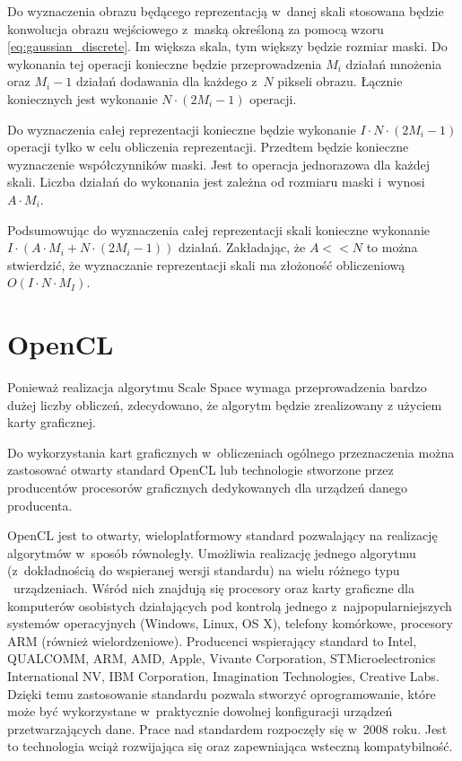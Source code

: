Do wyznaczenia obrazu będącego reprezentacją w~danej skali stosowana będzie konwolucja obrazu wejściowego z~maską określoną za pomocą wzoru \ref{eq:gaussian_discrete}. Im większa skala, tym większy będzie rozmiar maski. Do wykonania tej operacji konieczne będzie przeprowadzenia $ M_i $ działań mnożenia oraz $ M_i - 1 $ działań dodawania dla każdego z~$N$ pikseli obrazu. Łącznie koniecznych jest wykonanie $ N \cdot (2M_i - 1) $ operacji.

Do wyznaczenia całej reprezentacji konieczne będzie wykonanie $ I \cdot N \cdot (2M_i - 1) $ operacji tylko w celu obliczenia reprezentacji. Przedtem będzie konieczne wyznaczenie współczynników maski. Jest to operacja jednorazowa dla każdej skali. Liczba działań do wykonania jest zależna od rozmiaru maski i~wynosi $ A \cdot M_i $.

Podsumowując do wyznaczenia całej reprezentacji skali konieczne wykonanie $ I \cdot (A \cdot M_i + N \cdot (2M_i - 1)) $ działań. Zakładając, że $ A << N $ to można stwierdzić, że wyznaczanie reprezentacji skali ma złożoność obliczeniową $ O(I \cdot N \cdot M_I) $.

\section{OpenCL}
\label{sec:OpenCL}

Ponieważ realizacja algorytmu Scale Space wymaga przeprowadzenia bardzo dużej liczby obliczeń, zdecydowano, że algorytm będzie zrealizowany z użyciem karty graficznej.

Do wykorzystania kart graficznych w~obliczeniach ogólnego przeznaczenia można zastosować otwarty standard OpenCL lub technologie stworzone przez producentów procesorów graficznych dedykowanych dla urządzeń danego producenta.

OpenCL jest to otwarty, wieloplatformowy standard pozwalający na realizację algorytmów w~sposób równoległy. Umożliwia realizację jednego algorytmu (z~dokładnością do wspieranej wersji standardu) na wielu różnego typu ~urządzeniach. Wśród nich znajdują się procesory oraz karty graficzne dla komputerów osobistych działających pod kontrolą jednego z~najpopularniejszych systemów operacyjnych (Windows, Linux, OS X), telefony komórkowe, procesory ARM (również wielordzeniowe). Producenci wspierający standard to Intel,
QUALCOMM,
ARM,
AMD,
Apple,
Vivante Corporation,
STMicroelectronics International NV,
IBM Corporation,
Imagination Technologies,
Creative Labs.
Dzięki temu zastosowanie standardu pozwala stworzyć oprogramowanie, które może być wykorzystane w~praktycznie dowolnej konfiguracji urządzeń przetwarzających dane. Prace nad standardem rozpoczęły się w~2008 roku. Jest to technologia wciąż rozwijająca się oraz zapewniająca wsteczną kompatybilność. 

